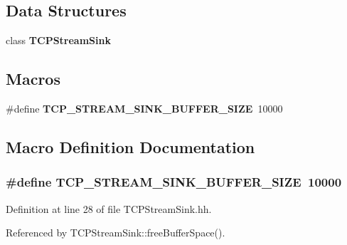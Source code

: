 \subsection*{Data Structures}
\begin{DoxyCompactItemize}
\item 
class {\bf T\+C\+P\+Stream\+Sink}
\end{DoxyCompactItemize}
\subsection*{Macros}
\begin{DoxyCompactItemize}
\item 
\#define {\bf T\+C\+P\+\_\+\+S\+T\+R\+E\+A\+M\+\_\+\+S\+I\+N\+K\+\_\+\+B\+U\+F\+F\+E\+R\+\_\+\+S\+I\+Z\+E}~10000
\end{DoxyCompactItemize}


\subsection{Macro Definition Documentation}
\subsubsection[{T\+C\+P\+\_\+\+S\+T\+R\+E\+A\+M\+\_\+\+S\+I\+N\+K\+\_\+\+B\+U\+F\+F\+E\+R\+\_\+\+S\+I\+Z\+E}]{\setlength{\rightskip}{0pt plus 5cm}\#define T\+C\+P\+\_\+\+S\+T\+R\+E\+A\+M\+\_\+\+S\+I\+N\+K\+\_\+\+B\+U\+F\+F\+E\+R\+\_\+\+S\+I\+Z\+E~10000}\label{TCPStreamSink_8hh_a26debd3e105cfda1ac1aae12790e8e7c}


Definition at line 28 of file T\+C\+P\+Stream\+Sink.\+hh.



Referenced by T\+C\+P\+Stream\+Sink\+::free\+Buffer\+Space().

